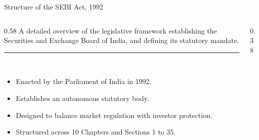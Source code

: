 \documentclass[aspectratio=169,10pt]{beamer}
\begin{document}
	\begin{frame}{Structure of the SEBI Act, 1992}
		\begin{columns}[T, onlytextwidth]
			\begin{column}{0.58\textwidth}
				\vspace{0.2cm}
				{\large A detailed overview of the legislative framework establishing the Securities and Exchange Board of India, and defining its statutory mandate.}\\[10pt]
				\textcolor{rpMuted}{\rule{5cm}{0.6pt}}\\[10pt]
				\begin{itemize}
					\item Enacted by the Parliament of India in \textcolor{rpGold}{1992}.
					\item Establishes an \textcolor{rpIris}{autonomous statutory body}.
					\item Designed to balance \textcolor{rpRose}{market regulation} with \textcolor{rpFoam}{investor protection}.
					\item Structured across \textcolor{rpLove}{10 Chapters} and Sections 1 to 35.
				\end{itemize}
			\end{column}
			\begin{column}{0.38\textwidth}
				\vspace{0.4cm}
			\end{column}
		\end{columns}
	\end{frame}
	
\end{document}
